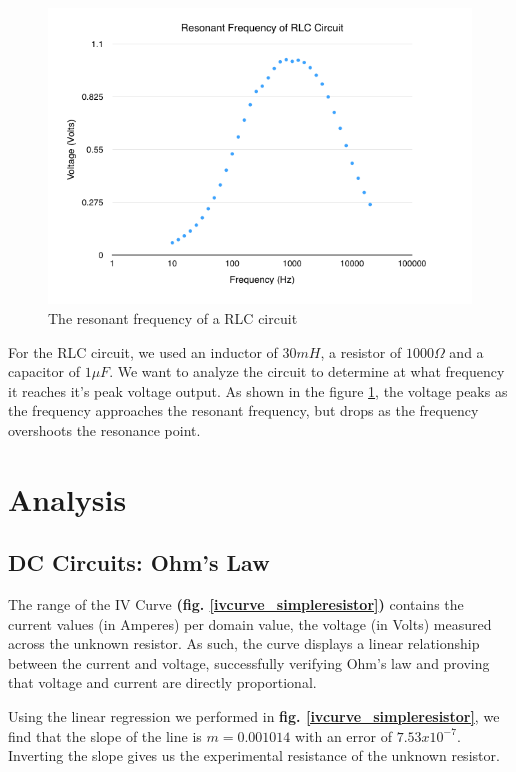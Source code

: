 \documentclass{article}
\begin{document}
\begin{figure}[H]
    \centering
    \includegraphics[width=\textwidth]{charts/rlccurve_resonant}
    \caption{The resonant frequency of a RLC circuit}
    \label{rlccurve_resonant}
\end{figure}

For the RLC circuit, we used an inductor of $30mH$, a resistor of $1000\Omega$
and a capacitor of $1\mu F$. We want to analyze the circuit to determine at what
frequency it reaches it's peak voltage output. As shown in the figure
\ref{rlccurve_resonant}, the voltage peaks as the frequency approaches the
resonant frequency, but drops as the frequency overshoots the resonance point.

\section{Analysis}

\subsection{DC Circuits: Ohm's Law}

The range of the IV Curve \textbf{(fig. \ref{ivcurve_simpleresistor})} contains
the current values (in Amperes) per domain value, the voltage (in Volts)
measured across the unknown resistor. As such, the curve displays a linear
relationship between the current and voltage, successfully verifying Ohm's law
and proving that voltage and current are directly proportional.

Using the linear regression we performed in \textbf{fig.
\ref{ivcurve_simpleresistor}}, we find that the slope of the line is $m =
0.001014$ with an error of $7.53 x 10^{-7}$. Inverting the slope gives us the
experimental resistance of the unknown resistor.
\end{document}
